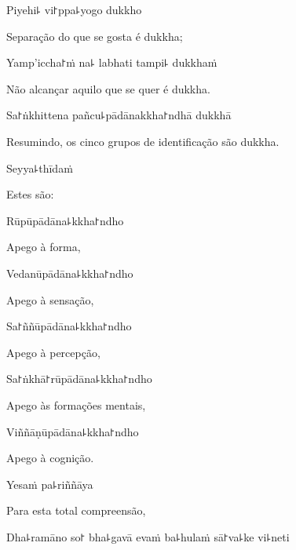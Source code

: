 Piyehi꜕ vi꜓ppa꜕yogo dukkho

\begin{english}
  Separação do que se gosta é dukkha;
\end{english}

Yamp'iccha꜓ṁ na꜕ labhati tampi꜕ dukkhaṁ

\begin{english}
  Não alcançar aquilo que se quer é dukkha.
\end{english}

Sa꜓ṅkhittena pañcu꜕pādānakkha꜓ndhā dukkhā

\begin{english}
  Resumindo, os cinco grupos de identificação são dukkha.
\end{english}

Seyya꜕thīdaṁ

\begin{english}
  Estes são:
\end{english}

\clearpage

Rūpūpādāna꜕kkha꜓ndho

\begin{english}
  Apego à forma,
\end{english}

Vedanūpādāna꜕kkha꜓ndho

\begin{english}
  Apego à sensação,
\end{english}

Sa꜓ññūpādāna꜕kkha꜓ndho

\begin{english}
  Apego à percepção,
\end{english}

Sa꜓ṅkhā꜓rūpādāna꜕kkha꜓ndho

\begin{english}
  Apego às formações mentais,
\end{english}

Viññāṇūpādāna꜕kkha꜓ndho

\begin{english}
  Apego à cognição.
\end{english}

Yesaṁ pa꜕riññāya

\begin{english}
  Para esta total compreensão,
\end{english}

Dha꜕ramāno so꜓ bha꜕gavā evaṁ ba꜕hulaṁ sā꜓va꜕ke vi꜕neti

